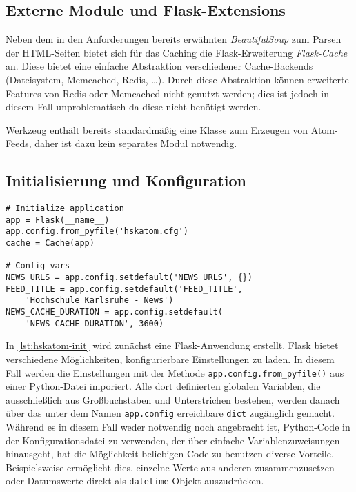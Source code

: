 \subsection{Externe Module und Flask-Extensions}

Neben dem in den Anforderungen bereits erwähnten \emph{BeautifulSoup} zum Parsen der
HTML-Seiten bietet sich für das Caching die Flask-Erweiterung \emph{Flask-Cache} an. Diese bietet
eine einfache Abstraktion verschiedener Cache-Backends (Dateisystem, Memcached, Redis, \ldots).
Durch diese Abstraktion können erweiterte Features von Redis oder Memcached nicht genutzt werden;
dies ist jedoch in diesem Fall unproblematisch da diese nicht benötigt werden.

Werkzeug enthält bereits standardmäßig eine Klasse zum Erzeugen von Atom-Feeds, daher ist dazu kein
separates Modul notwendig.

\subsection{Initialisierung und Konfiguration}

\begin{lstlisting}[caption=HSKAtom - Initialisierung,label=lst:hskatom-init]
# Initialize application
app = Flask(__name__)
app.config.from_pyfile('hskatom.cfg')
cache = Cache(app)

# Config vars
NEWS_URLS = app.config.setdefault('NEWS_URLS', {})
FEED_TITLE = app.config.setdefault('FEED_TITLE',
    'Hochschule Karlsruhe - News')
NEWS_CACHE_DURATION = app.config.setdefault(
    'NEWS_CACHE_DURATION', 3600)
\end{lstlisting}

In \autoref{lst:hskatom-init} wird zunächst eine Flask-Anwendung erstellt. Flask bietet verschiedene
Möglichkeiten, konfigurierbare Einstellungen zu laden. In diesem Fall werden die Einstellungen mit
der Methode \lstinline{app.config.from_pyfile()} aus einer Python-Datei imporiert. Alle dort
definierten globalen Variablen, die ausschließlich aus Großbuchstaben und Unterstrichen bestehen,
werden danach über das unter dem Namen \lstinline{app.config} erreichbare \lstinline{dict}
zugänglich gemacht. Während es in diesem Fall weder notwendig noch angebracht ist, Python-Code in
der Konfigurationsdatei zu verwenden, der über einfache Variablenzuweisungen hinausgeht, hat die
Möglichkeit beliebigen Code zu benutzen diverse Vorteile. Beispielsweise ermöglicht dies, einzelne
Werte aus anderen zusammenzusetzen oder Datumswerte direkt als \lstinline{datetime}-Objekt
auszudrücken.

